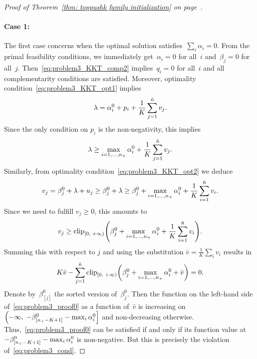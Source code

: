 \begin{proof}[Proof of Theorem~\ref{thm: toppushk family initialization} on page~\pageref{thm: toppushk family initialization}]
  \paragraph*{Case 1:} The first case concerns when the optimal solution satisfies~$\sum_i  \alpha_i = 0$. From the primal feasibility conditions, we immediately get~$\alpha_i = 0$ for all~$i$ and~$\beta_j = 0$ for all~$j$. Then~\eqref{eq:problem3_KKT_comp2} implies~$q_i = 0$ for all~$i$ and all complementarity conditions are satisfied. Moreover, optimality condition~\eqref{eq:problem3_KKT_opt1} implies
  \begin{equation*}
    \lambda = \alpha_i^0 + p_i + \frac{1}{K} \sum_{j = 1}^{\tilde{n}} v_j.
  \end{equation*}
  Since the only condition on $p_i$ is the non-negativity, this implies
  \begin{equation*}
    \lambda \ge \max_{i=1, \ldots, n_{+}} \alpha_i^0 + \frac{1}{K} \sum_{j = 1}^{\tilde{n}} v_j.
  \end{equation*}
  Similarly, from optimality condition~\eqref{eq:problem3_KKT_opt2} we deduce
  \begin{equation*}
    v_j
      = \beta_j^0 + \lambda + u_j
      \ge \beta_j^0 + \lambda
      \ge \beta_j^0 + \max_{i=1,\dots,n_{+}} \alpha_i^0 + \frac{1}{K} \sum_{i = 1}^{\tilde{n}} v_i.
  \end{equation*}
  Since we need to fulfill $v_j \ge 0$, this amounts to
  \begin{equation*}
    v_j 
      \ge \clip[u]{0}{+\infty}{\beta_j^0 + \max_{i=1,\dots,\npos} \alpha_i^0 + \frac{1}{K} \sum_{i = 1}^{\ntil} v_i}.
  \end{equation*}
  Summing this with respect to $j$ and using the substitution $\bar{v} = \frac{1}{K}\sum_i v_i$ results in
  \begin{equation}\label{eq:problem3_proof0}
    K\bar{v} - \sum_{j=1}^{\ntil} \clip[u]{0}{+\infty}{\beta_j^0 + \max_{i=1,\dots,\npos} \alpha_i^0 + \bar{v}} = 0.
  \end{equation}
  Denote by~$\beta_{[j]}^0$ the sorted version of~$\beta_j^0$. Then the function on the left-hand side of~\eqref{eq:problem3_proof0} as a function of~$\bar{v}$ is increasing on~$\left(-\infty, \; -\beta_{[\npos - K + 1]}^0 - \max_{i} \alpha_i^0 \right]$ and non-decreasing otherwise. Thus,~\eqref{eq:problem3_proof0} can be satisfied if and only if its function value at~$- \beta_{[n_{+} - K + 1]}^0 - \max_{i} \alpha_i^0$ is non-negative. But this is precisely the violation of~\eqref{eq:problem3_cond}.
  

\end{proof}
